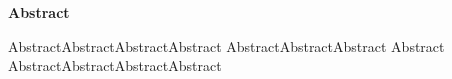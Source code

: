 \thispagestyle{plain}
\begin{fullwidth}
\begin{center}
    \LARGE
    \textcolor{itesodblue}{\textbf{\mytitle}}\\
    \Large
    \vspace{0.4cm}
    \textcolor{itesomblue}{\textbf{\myauthor}}\\
    \vspace{0.9cm}
    \textcolor{itesolblue}{\textbf{Abstract}}
\end{center}

AbstractAbstractAbstractAbstract AbstractAbstractAbstract Abstract AbstractAbstractAbstractAbstract


\end{fullwidth}
